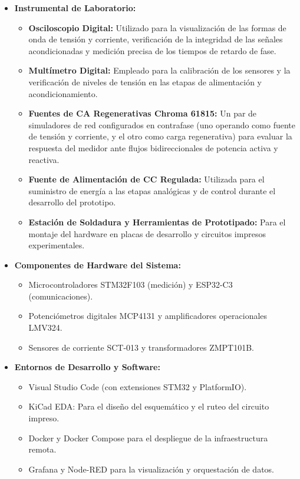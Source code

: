 \documentclass[12pt, a4paper]{article} %
\begin{document}
\begin{itemize}
  \item \textbf{Instrumental de Laboratorio:}
    \begin{itemize}
      \item \textbf{Osciloscopio Digital:} Utilizado para la visualización de las formas de onda de tensión y corriente, verificación de la integridad de las señales acondicionadas y medición precisa de los tiempos de retardo de fase.
      \item \textbf{Multímetro Digital:} Empleado para la calibración de los sensores y la verificación de niveles de tensión en las etapas de alimentación y acondicionamiento.
      \item \textbf{Fuentes de CA Regenerativas Chroma 61815:} Un par de simuladores de red configurados en contrafase (uno operando como fuente de tensión y corriente, y el otro como carga regenerativa) para evaluar la respuesta del medidor ante flujos bidireccionales de potencia activa y reactiva.
      \item \textbf{Fuente de Alimentación de CC Regulada:} Utilizada para el suministro de energía a las etapas analógicas y de control durante el desarrollo del prototipo.
      \item \textbf{Estación de Soldadura y Herramientas de Prototipado:} Para el montaje del hardware en placas de desarrollo y circuitos impresos experimentales.
    \end{itemize}
  \item \textbf{Componentes de Hardware del Sistema:}
    \begin{itemize}
      \item Microcontroladores STM32F103 (medición) y ESP32-C3 (comunicaciones).
      \item Potenciómetros digitales MCP4131 y amplificadores operacionales LMV324.
      \item Sensores de corriente SCT-013 y transformadores ZMPT101B.
    \end{itemize}
  \item \textbf{Entornos de Desarrollo y Software:}
    \begin{itemize}
      \item Visual Studio Code (con extensiones STM32 y PlatformIO).
      \item KiCad EDA: Para el diseño del esquemático y el ruteo del circuito impreso.
      \item Docker y Docker Compose para el despliegue de la infraestructura remota.
      \item Grafana y Node-RED para la visualización y orquestación de datos.
    \end{itemize}
\end{itemize}
\end{document}

